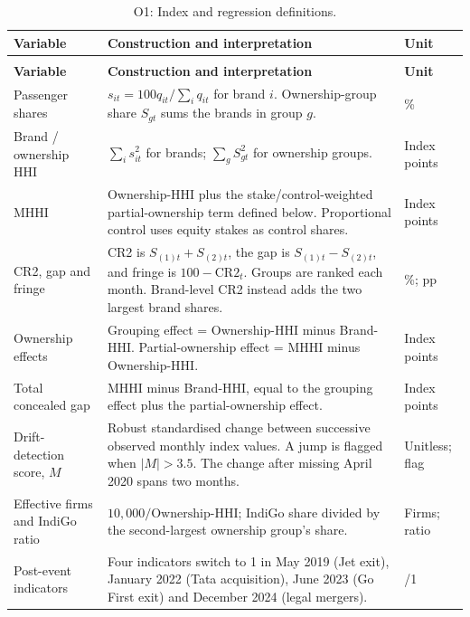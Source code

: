 \begin{longtable}{|>{\raggedright\arraybackslash}p{}|>{\raggedright\arraybackslash}p{}|>{\raggedright\arraybackslash}p{}|}
\caption{O1: Index and regression definitions.}\label{tab:team-o1-variables}\\
\hline
\textbf{Variable} & \textbf{Construction and interpretation} & \textbf{Unit} \\
\hline
\endfirsthead
\multicolumn{3}{c}{\small Table~\thetable\ (continued)}\\[4pt]
\hline
\textbf{Variable} & \textbf{Construction and interpretation} & \textbf{Unit} \\
\hline
\endhead
Passenger shares & $s_{it}=100q_{it}/\sum_i q_{it}$ for brand $i$. Ownership-group share $S_{gt}$ sums the brands in group $g$. & \% \\
\hline
Brand / ownership HHI & $\sum_i s_{it}^{2}$ for brands; $\sum_g S_{gt}^{2}$ for ownership groups. & Index points \\
\hline
MHHI & Ownership-HHI plus the stake/control-weighted partial-ownership term defined below. Proportional control uses equity stakes as control shares. & Index points \\
\hline
CR2, gap and fringe & CR2 is $S_{(1)t}+S_{(2)t}$, the gap is $S_{(1)t}-S_{(2)t}$, and fringe is $100-\mathrm{CR2}_t$. Groups are ranked each month. Brand-level CR2 instead adds the two largest brand shares. & \%; pp \\
\hline
Ownership effects & Grouping effect = Ownership-HHI minus Brand-HHI. Partial-ownership effect = MHHI minus Ownership-HHI. & Index points \\
\hline
Total concealed gap & MHHI minus Brand-HHI, equal to the grouping effect plus the partial-ownership effect. & Index points \\
\hline
Drift-detection score, $M$ & Robust standardised change between successive observed monthly index values. A jump is flagged when $|M|>3.5$. The change after missing April 2020 spans two months. & Unitless; flag \\
\hline
Effective firms and IndiGo ratio & $10{,}000/\mathrm{Ownership\mbox{-}HHI}$; IndiGo share divided by the second-largest ownership group's share. & Firms; ratio \\
\hline
Post-event indicators & Four indicators switch to 1 in May 2019 (Jet exit), January 2022 (Tata acquisition), June 2023 (Go First exit) and December 2024 (legal mergers). & 0/1 \\

\end{longtable}
